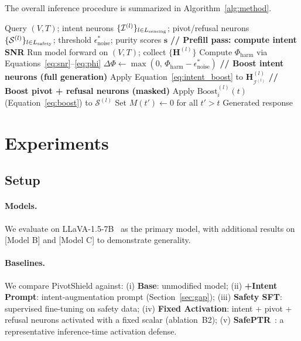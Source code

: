 \documentclass{article}
\newcommand{\method}{PivotShield\xspace}
\newcommand{\Phiharm}{\Phi_{\mathrm{harm}}}
\newcommand{\epsnoise}{\epsilon_{\mathrm{noise}}}
\begin{document}
The overall inference procedure is summarized in
Algorithm~\ref{alg:method}.

\begin{algorithm}[t]
  \caption{\method: Adaptive Pivot Neuron Activation}
  \label{alg:method}
  \begin{algorithmic}[1]
    \REQUIRE Query $(V, T)$; intent neurons
      $\{\mathcal{I}^{(l)}\}_{l \in L_{\rm sensing}}$;
      pivot/refusal neurons
      $\{\mathcal{S}^{(l)}\}_{l \in L_{\rm safety}}$;
      threshold $\epsnoise^*$; purity scores $\mathbf{s}$
    \STATE \textbf{// Prefill pass: compute intent SNR}
    \STATE Run model forward on $(V,T)$; collect
      $\{\mathbf{H}^{(l)}\}$
    \STATE Compute $\Phiharm$ via Equations~\ref{eq:snr}--\ref{eq:phi}
    \STATE $\Delta\Phi \leftarrow \max(0,\, \Phiharm - \epsnoise^*)$
    \STATE \textbf{// Boost intent neurons (full generation)}
      \STATE Apply Equation~\ref{eq:intent_boost} to
        $\mathbf{H}_{\mathcal{I}^{(l)}}^{(l)}$
    \ENDFOR
    \STATE \textbf{// Boost pivot + refusal neurons (masked)}
        \STATE Apply $\mathrm{Boost}_i^{(l)}(t)$
          (Equation~\ref{eq:boost}) to $\mathcal{S}^{(l)}$
      \ENDFOR
        \STATE Set $M(t') \leftarrow 0$ for all $t' > t$
      \ENDIF
    \ENDFOR
    \STATE \RETURN Generated response
  \end{algorithmic}
\end{algorithm}

\section{Experiments}
\label{sec:exp}

\subsection{Setup}

\paragraph{Models.}
We evaluate on LLaVA-1.5-7B~\citep{PLACEHOLDER_llava_verify}
as the primary model, with additional results on
[Model B] and [Model C] to demonstrate generality.

\paragraph{Baselines.}
We compare \method against:
(i) \textbf{Base}: unmodified model;
(ii) \textbf{+Intent Prompt}: intent-augmentation prompt (Section~\ref{sec:gap});
(iii) \textbf{Safety SFT}: supervised fine-tuning on safety data;
(iv) \textbf{Fixed Activation}: intent + pivot + refusal neurons
activated with a fixed scalar (ablation~B2);
(v) \textbf{SafePTR}~\citep{PLACEHOLDER_safeptr_verify}: a
representative inference-time activation defense.
\end{document}
